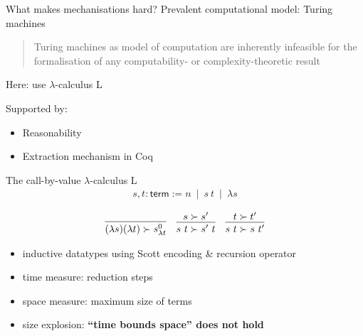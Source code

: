 \documentclass[11pt,usenames,dvipsnames,
hyperref={pdfencoding=auto,psdextra}]{beamer}
\def\showTODOs{}
\newcommand{\TODO}[1]{\ifthenelse{\isundefined{\showTODOs}}{}{\colorbox{red}{\LARGE TODO}:#1}}
\newcommand{\bnfmid}{~\mid~}
\begin{document}
\begin{frame}{What makes mechanisations hard?}
  Prevalent computational model: Turing machines 
  $~$\\[5ex]
  \begin{quote}
    Turing machines as model of computation are inherently infeasible for the formalisation of any computability- or complexity-theoretic result
  \end{quote}
  \raggedleft{} \cite{ForsterEtAl:2019:VerifiedTMs}

  \raggedright{}
  Here: use $\lambda$-calculus L

  Supported by: 
  \begin{itemize}
    \item Reasonability~\cite{ForsterKunzeRoth:2019:wcbv-Reasonable}
    \item Extraction mechanism in Coq~\cite{ForsterKunze:2019:Certifying-extraction}
  \end{itemize}
\end{frame}

\newcommand{\Term}{\textsf{term}}
\begin{frame}{The call-by-value $\lambda$-calculus L}
\begin{align*}
    s, t : \Term := n \bnfmid s~t \bnfmid \lambda s
  \end{align*}

  \begin{align*}
    \infer{(\lambda s)(\lambda t) \succ s^0_{\lambda t}}{}
    && 
    \infer{s~t \succ s'~t}{s \succ s'}
    && 
    \infer{s~t \succ s~t'}{t \succ t'}
  \end{align*}
  \begin{itemize}
    \item inductive datatypes using Scott encoding \& recursion operator
    \item time measure: reduction steps
    \item space measure: maximum size of terms
    \item size explosion: \textbf{``time bounds space'' does not hold}
  \end{itemize}
\end{frame}
\end{document}
